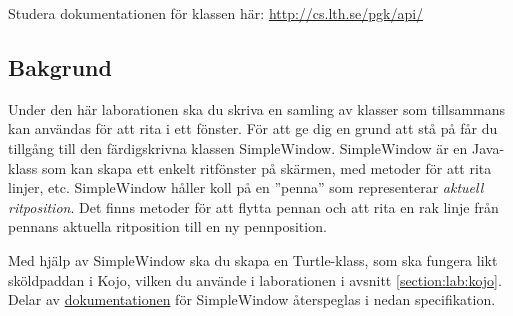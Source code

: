

\Lab{\LabWeekFIVE}

\begin{Goals}

\end{Goals}

\begin{Preparations}
\item {}

\item Studera dokumentationen för klassen  här: \url{http://cs.lth.se/pgk/api/}


\end{Preparations}

\subsection{Bakgrund}

Under den här laborationen ska du skriva en samling av klasser som tillsammans kan användas för att rita i ett fönster. För att ge dig en grund att stå på får du tillgång till den färdigskrivna klassen SimpleWindow. SimpleWindow är en Java-klass som kan skapa ett enkelt ritfönster på skärmen, med metoder för att rita linjer, etc. SimpleWindow håller koll på en ''penna'' som representerar \textit{aktuell ritposition}. Det finns metoder för att flytta pennan och att rita en rak linje från pennans aktuella ritposition till en ny pennposition.

Med hjälp av SimpleWindow ska du skapa en Turtle-klass, som ska fungera likt sköldpaddan i Kojo, vilken du använde i laborationen i avsnitt \ref{section:lab:kojo}. Delar av \href{http://cs.lth.se/pgk/api/}{dokumentationen} för SimpleWindow återspeglas i nedan specifikation.

